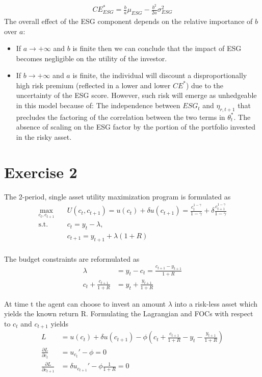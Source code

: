 \documentclass[12pt]{article}
\begin{document}
	\begin{align}
		CE^*_{ESG} = \frac{b}{a}\mu_{ESG} -\frac{b^2}{2a}\sigma_{ESG}^2
	\end{align}
	The overall effect of the ESG component depends on the relative importance of $b$ over $a$:
	\begin{itemize}
		\item If ${a\to+\infty}$ and $b$ is finite then we can conclude that the impact of ESG becomes negligible on the utility of the investor.
		\item  If ${b\to+\infty}$ and $a$ is finite, the individual will discount a disproportionally high risk premium (reflected in a lower and lower $CE^*$) due to the uncertainty of the ESG score. However, such risk will emerge as unhedgeable in this model because of:
		\subitem The independence between $ESG_t$ and $\eta_{r, t+1}$ that precludes the factoring of the correlation between the two terms in $\theta_{t}^*$.
		\subitem The absence of scaling on the ESG factor by the portion of the portfolio invested in the risky asset. 
	\end{itemize}
	
	\section{Exercise 2}
	The 2-period, single asset utility maximization program is formulated as
	\begin{align*}
		\max_{c_t, c_{t+1}} \quad & U(c_t, c_{t+1}) = u(c_t) + \delta u(c_{t+1}) = \frac{c_t^{1-\gamma}}{1-\gamma} + \delta \frac{c_{t+1}^{1-\gamma}}{1-\gamma}\\
		\textrm{s.t.} \quad & c_t = y_t - \lambda,\\
		\quad & c_{t+1} = y_{t+1} + \lambda (1+R)\\
	\end{align*}
	
	The budget constraints are reformulated as
	\begin{align*}
		\lambda &= y_t - c_t = \frac{c_{t+1} - y_{t+1}}{1+R}\\
		c_t + \frac{c_{t+1}}{1+R} &= y_t + \frac{y_{t+1}}{1+R}
	\end{align*}
	
	At time t the agent can choose to invest an amount $\lambda$ into a risk-less asset which yields the known return R. Formulating the Lagrangian and FOCs with respect to $c_t$ and $c_{t+1}$ yields
	\begin{align*}
		L &= u(c_t) + \delta u(c_{t+1}) - \phi \left(c_t + \frac{c_{t+1}}{1+R} - y_t - \frac{y_{t+1}}{1+R}\right)\\
		\frac{\partial L}{\partial c_t} &= u_{c_t}' - \phi = 0\\
		\frac{\partial L}{\partial c_{t+1}} &= \delta u_{c_{t+1}}' - \phi \frac{1}{1+R}= 0
	\end{align*}
	
\end{document}
